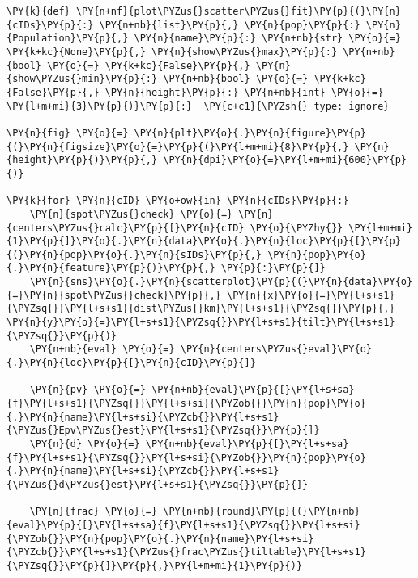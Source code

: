 \begin{tcolorbox}[breakable, size=fbox, boxrule=1pt, pad at break*=1mm,colback=cellbackground, colframe=cellborder]
\begin{Verbatim}[commandchars=\\\{\}]
\PY{k}{def} \PY{n+nf}{plot\PYZus{}scatter\PYZus{}fit}\PY{p}{(}\PY{n}{cIDs}\PY{p}{:} \PY{n+nb}{list}\PY{p}{,} \PY{n}{pop}\PY{p}{:} \PY{n}{Population}\PY{p}{,} \PY{n}{name}\PY{p}{:} \PY{n+nb}{str} \PY{o}{=} \PY{k+kc}{None}\PY{p}{,} \PY{n}{show\PYZus{}max}\PY{p}{:} \PY{n+nb}{bool} \PY{o}{=} \PY{k+kc}{False}\PY{p}{,} \PY{n}{show\PYZus{}min}\PY{p}{:} \PY{n+nb}{bool} \PY{o}{=} \PY{k+kc}{False}\PY{p}{,} \PY{n}{height}\PY{p}{:} \PY{n+nb}{int} \PY{o}{=} \PY{l+m+mi}{3}\PY{p}{)}\PY{p}{:}  \PY{c+c1}{\PYZsh{} type: ignore}

\PY{n}{fig} \PY{o}{=} \PY{n}{plt}\PY{o}{.}\PY{n}{figure}\PY{p}{(}\PY{n}{figsize}\PY{o}{=}\PY{p}{(}\PY{l+m+mi}{8}\PY{p}{,} \PY{n}{height}\PY{p}{)}\PY{p}{,} \PY{n}{dpi}\PY{o}{=}\PY{l+m+mi}{600}\PY{p}{)}

\PY{k}{for} \PY{n}{cID} \PY{o+ow}{in} \PY{n}{cIDs}\PY{p}{:}
    \PY{n}{spot\PYZus{}check} \PY{o}{=} \PY{n}{centers\PYZus{}calc}\PY{p}{[}\PY{n}{cID} \PY{o}{\PYZhy{}} \PY{l+m+mi}{1}\PY{p}{]}\PY{o}{.}\PY{n}{data}\PY{o}{.}\PY{n}{loc}\PY{p}{[}\PY{p}{(}\PY{n}{pop}\PY{o}{.}\PY{n}{sIDs}\PY{p}{,} \PY{n}{pop}\PY{o}{.}\PY{n}{feature}\PY{p}{)}\PY{p}{,} \PY{p}{:}\PY{p}{]}
    \PY{n}{sns}\PY{o}{.}\PY{n}{scatterplot}\PY{p}{(}\PY{n}{data}\PY{o}{=}\PY{n}{spot\PYZus{}check}\PY{p}{,} \PY{n}{x}\PY{o}{=}\PY{l+s+s1}{\PYZsq{}}\PY{l+s+s1}{dist\PYZus{}km}\PY{l+s+s1}{\PYZsq{}}\PY{p}{,} \PY{n}{y}\PY{o}{=}\PY{l+s+s1}{\PYZsq{}}\PY{l+s+s1}{tilt}\PY{l+s+s1}{\PYZsq{}}\PY{p}{)}
    \PY{n+nb}{eval} \PY{o}{=} \PY{n}{centers\PYZus{}eval}\PY{o}{.}\PY{n}{loc}\PY{p}{[}\PY{n}{cID}\PY{p}{]}

    \PY{n}{pv} \PY{o}{=} \PY{n+nb}{eval}\PY{p}{[}\PY{l+s+sa}{f}\PY{l+s+s1}{\PYZsq{}}\PY{l+s+si}{\PYZob{}}\PY{n}{pop}\PY{o}{.}\PY{n}{name}\PY{l+s+si}{\PYZcb{}}\PY{l+s+s1}{\PYZus{}Epv\PYZus{}est}\PY{l+s+s1}{\PYZsq{}}\PY{p}{]}
    \PY{n}{d} \PY{o}{=} \PY{n+nb}{eval}\PY{p}{[}\PY{l+s+sa}{f}\PY{l+s+s1}{\PYZsq{}}\PY{l+s+si}{\PYZob{}}\PY{n}{pop}\PY{o}{.}\PY{n}{name}\PY{l+s+si}{\PYZcb{}}\PY{l+s+s1}{\PYZus{}d\PYZus{}est}\PY{l+s+s1}{\PYZsq{}}\PY{p}{]}

    \PY{n}{frac} \PY{o}{=} \PY{n+nb}{round}\PY{p}{(}\PY{n+nb}{eval}\PY{p}{[}\PY{l+s+sa}{f}\PY{l+s+s1}{\PYZsq{}}\PY{l+s+si}{\PYZob{}}\PY{n}{pop}\PY{o}{.}\PY{n}{name}\PY{l+s+si}{\PYZcb{}}\PY{l+s+s1}{\PYZus{}frac\PYZus{}tiltable}\PY{l+s+s1}{\PYZsq{}}\PY{p}{]}\PY{p}{,}\PY{l+m+mi}{1}\PY{p}{)}


\end{Verbatim}
\end{tcolorbox}
